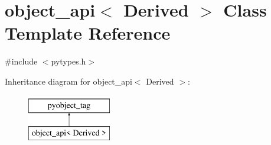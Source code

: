\hypertarget{classobject__api}{}\section{object\+\_\+api$<$ Derived $>$ Class Template Reference}
\label{classobject__api}


{\ttfamily \#include $<$pytypes.\+h$>$}

Inheritance diagram for object\+\_\+api$<$ Derived $>$\+:\begin{figure}[H]
\begin{center}
\leavevmode
\includegraphics[height=2.000000cm]{classobject__api}
\end{center}
\end{figure}
